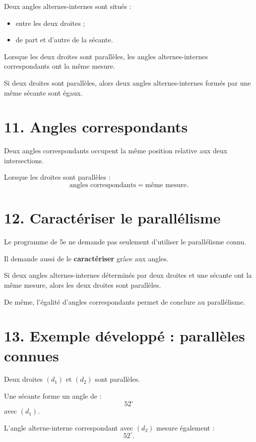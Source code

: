 Deux angles alternes-internes sont situés :
\begin{itemize}
\item entre les deux droites ;
\item de part et d'autre de la sécante.
\end{itemize}

Lorsque les deux droites sont parallèles, les angles alternes-internes correspondants ont la même mesure.

\begin{propriete}
Si deux droites sont parallèles, alors deux angles alternes-internes formés par une même sécante sont égaux.
\end{propriete}

\section{11. Angles correspondants}

Deux angles correspondants occupent la même position relative aux deux intersections.

Lorsque les droites sont parallèles :
\[
\text{angles correspondants}=\text{même mesure}.
\]

\section{12. Caractériser le parallélisme}

Le programme de 5e ne demande pas seulement d'utiliser le parallélisme connu.

Il demande aussi de le \textbf{caractériser} grâce aux angles.

\begin{propriete}
Si deux angles alternes-internes déterminés par deux droites et une sécante ont la même mesure, alors les deux droites sont parallèles.
\end{propriete}

De même, l'égalité d'angles correspondants permet de conclure au parallélisme.

\section{13. Exemple développé : parallèles connues}

Deux droites $(d_1)$ et $(d_2)$ sont parallèles.

Une sécante forme un angle de :
\[
52^\circ
\]
avec $(d_1)$.

L'angle alterne-interne correspondant avec $(d_2)$ mesure également :
\[
\boxed{52^\circ}.
\]

